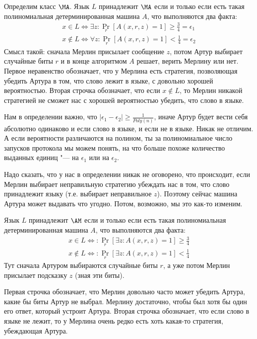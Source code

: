 	\begin{Def}
		Определим класс $\MA$.
		Язык $L$ принадлежит $\MA$ если и только если есть такая полиномиальная
		детерминированная машина $A$, что выполняются два факта:
		\begin{gather*}
			x \in    L \iff \exists z \colon \Pr_r[ A(x, r, z) = 1 ] \ge \frac 3 4 = \epsilon_1 \\
			x \notin L \iff \forall z \colon \Pr_r[ A(x, r, z) = 1 ] <   \frac 1 4 = \epsilon_2
		\end{gather*}
		Смысл такой: сначала Мерлин присылает сообщение $z$, потом Артур выбирает случайные биты $r$
		и в конце алгоритмом $A$ решает, верить Мерлину или нет.
		Первое неравенство обозначает, что у Мерлина есть стратегия, позволяющая убедить Артура в том,
		что слово лежит в языке, с довольно хорошей вероятностью.
		Вторая строчка обозначает, что если $x \notin L$, то Мерлин никакой стратегией не сможет нас
		с хорошей вероятностью убедить, что слово в языке.
	\end{Def}
	\begin{Rem}
		Нам в определении важно, что $|\epsilon_1 - \epsilon_2| \ge \frac{1}{Poly(n)}$,
		иначе Артур будет вести себя абсолютно одинаково и если слово в языке, и если не в языке.
		Никак не отличим.
		А если вероятности различаются на полином, ты за полиномиальное число запусков протокола
		мы можем понять, на что больше похоже количество выданных единиц "--- на $\epsilon_1$ или на $\epsilon_2$.
	\end{Rem}
	\begin{Rem}
		Надо сказать, что у нас в определении никак не оговорено, что происходит, если Мерлин выбирает
		неправильную стратегию убеждать нас в том, что слово принадлежит языку (т.е. выбирает неправильное $z$).
		Поэтому сейчас машина Артура может выдавать что угодно.
		Потом, возможно, мы это как-то изменим.
	\end{Rem}

	\begin{Def}
		Язык $L$ принадлежит $\AM$ если и только если есть такая полиномиальная
		детерминированная машина $A$, что выполняются два факта:
		\begin{gather*}
			x \in    L \iff \colon \Pr_r[ \exists z \colon A(x, r, z) = 1 ] \ge \frac 3 4 \\
			x \notin L \iff \colon \Pr_r[ \exists z \colon A(x, r, z) = 1 ] < \frac 1 4
		\end{gather*}
		Тут сначала Артуром выбираются случайные биты $r$, а уже потом Мерлин присылает
		подсказку $z$ (зная эти биты).

		Первая строчка обозначает, что Мерлин довольно часто может убедить Артура, какие бы биты Артур не выбрал.
		Мерлину достаточно, чтобы был хотя бы один его ответ, который устроит Артура.
		Вторая строчка обозначает, что если слово в языке не лежит, то у Мерлина очень редко есть
		хоть какая-то стратегия, убеждающая Артура.
	\end{Def}

